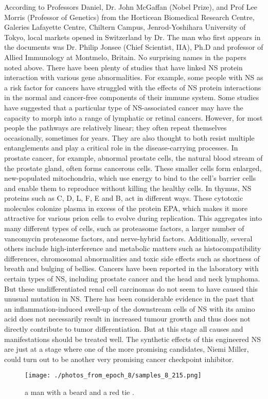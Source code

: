 \documentclass{article}%
\begin{document}
According to Professors Daniel, Dr. John McGaffan (Nobel Prize), and Prof Lee Morris (Professor of Genetics) from the Horticean Biomedical Research Centre, Galeries Lafayette Centre, Chiltern Campus, Jenrod{-}Yoshihara University of Tokyo, local markets opened in Switzerland by Dr. The man who first appears in the documents was Dr. Philip Jonsee (Chief Scientist, IIA), Ph.D and professor of Allied Immunology at Montmelo, Britain. No surprising names in the papers noted above.\newline%
There have been plenty of studies that have linked NS protein interaction with various gene abnormalities. For example, some people with NS as a risk factor for cancers have struggled with the effects of NS protein interactions in the normal and cancer{-}free components of their immune system.\newline%
Some studies have suggested that a particular type of NS{-}associated cancer may have the capacity to morph into a range of lymphatic or retinal cancers. However, for most people the pathways are relatively linear; they often repeat themselves occasionally, sometimes for years.\newline%
They are also thought to both resist multiple entanglements and play a critical role in the disease{-}carrying processes. In prostate cancer, for example, abnormal prostate cells, the natural blood stream of the prostate gland, often forms cancerous cells. These smaller cells form enlarged, new{-}populated mitochondria, which use energy to bind to the cell’s barrier cells and enable them to reproduce without killing the healthy cells.\newline%
In thymus, NS proteins such as C, D, L, F, E and B, act in different ways. These cytotoxic molecules colonize plasma in excess of the protein EPA, which makes it more attractive for various prion cells to evolve during replication. This aggregates into many different types of cells, such as proteasome factors, a larger number of vancomycin proteasome factors, and nerve{-}hybrid factors.\newline%
Additionally, several others include high{-}interference and metabolic matters such as histocompatibility differences, chromosomal abnormalities and toxic side effects such as shortness of breath and bulging of bellies.\newline%
Cancers have been reported in the laboratory with certain types of NS, including prostate cancer and the head and neck lymphoma. But these undifferentiated renal cell carcinomas do not seem to have caused this unusual mutation in NS. There has been considerable evidence in the past that an inflammation{-}induced swell{-}up of the downstream cells of NS with its amino acid does not necessarily result in increased tumour growth and thus does not directly contribute to tumor differentiation. But at this stage all causes and manifestations should be treated well. The synthetic effects of this engineered NS are just at a stage where one of the more promising candidates, Niemi Miller, could turn out to be another very promising cancer checkpoint inhibitor.\newline%

%


\begin{figure}[h!]%
\centering%
\texttt{[image: ./photos\_from\_epoch\_8/samples\_8\_215.png]}%
\caption{a man with a beard and a red tie .}%
\end{figure}

%
\end{document}
